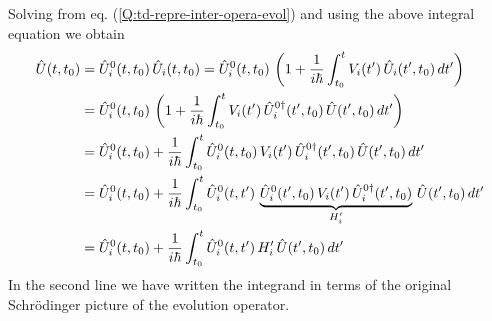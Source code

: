 Solving from eq. (\ref{Q:td-repre-inter-opera-evol}) and using the above integral equation we obtain
\begin{align}\label{Q:td-expan-oper-evol-1}
  \hat{U}(t,t_{0})&= \hat{U}^{0}_{i}(t,t_{0})\, \hat{U}_{i}(t,t_{0}) =  \hat{U}^{0}_{i}(t,t_{0})\,\left( 1 + \frac{1}{i\hbar} \int_{t_{0}}^{t} V_{i}(t')\, \hat{U}_{i}(t',t_{0}) \, dt' \right) \notag \\
&= \hat{U}^{0}_{i}(t,t_{0})\,\left( 1 + \frac{1}{i\hbar} \int_{t_{0}}^{t} V_{i}(t')\, \hat{U}^{0 \dag}_{i}(t',t_{0}) \, \hat{U}(t',t_{0}) \, dt' \right) \notag \\
 &= \hat{U}^{0}_{i}(t,t_{0}) + \frac{1}{i\hbar} \int_{t_{0}}^{t} \hat{U}^{0}_{i}(t,t_{0})\, V_{i}(t')\, \hat{U}^{0 \dag}_{i}(t',t_{0}) \, \hat{U}(t',t_{0}) \, dt' \notag \\
 &= \hat{U}^{0}_{i}(t,t_{0}) + \frac{1}{i\hbar} \int_{t_{0}}^{t} \hat{U}^{0}_{i}(t,t')\, \underbrace{\hat{U}^{0}_{i}(t',t_{0})\, V_{i}(t')\, \hat{U}^{0 \dag}_{i}(t',t_{0})}_{H'_{i}} \, \hat{U}(t',t_{0}) \, dt' \notag \\
 &= \hat{U}^{0}_{i}(t,t_{0}) + \frac{1}{i\hbar} \int_{t_{0}}^{t} \hat{U}^{0}_{i}(t,t')\, H'_{i} \, \hat{U}(t',t_{0}) \, dt' 
\end{align}
%
In the second line we have written the integrand in terms of the original Schr\"{o}dinger picture of the evolution operator. 

